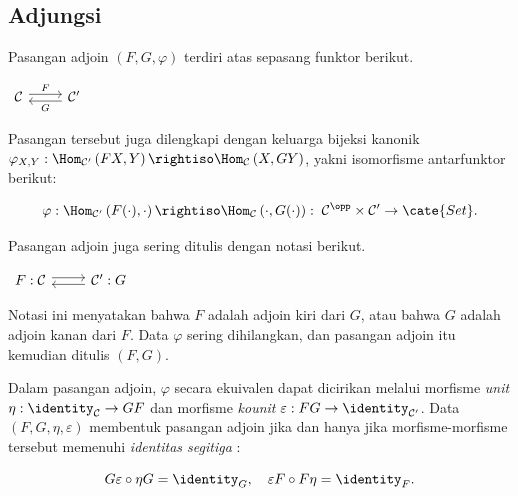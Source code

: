\subsection*{Adjungsi}

Pasangan adjoin $(F, G, \varphi)$ terdiri atas sepasang funktor berikut.

$\begin{tikzcd}
	\mathcal{C} \arrow[shift left, r, "F"] & \mathcal{C}' \arrow[shift left, l, "G"]
\end{tikzcd}$

Pasangan tersebut juga dilengkapi dengan keluarga bijeksi kanonik
$\varphi_{X, Y}: \Hom_{\mathcal{C}'}\left(FX, Y \right) \rightiso
\Hom_{\mathcal{C}}\left(X, GY \right)$, yakni isomorfisme antarfunktor berikut:

\[ \varphi: \Hom_{\mathcal{C}'}\left(F(\cdot), \cdot \right) \rightiso
\Hom_{\mathcal{C}}\left(\cdot, G(\cdot) \right): \;
\mathcal{C}^{\opp} \times \mathcal{C}' \to \cate{Set}. \]

Pasangan adjoin juga sering ditulis dengan notasi berikut.

$\begin{tikzcd}
	F: \mathcal{C} \arrow[shift left, r] & \mathcal{C}' \arrow[l, shift left] : G
\end{tikzcd}$

Notasi ini menyatakan bahwa $F$ adalah adjoin kiri dari $G$, atau bahwa $G$ adalah
adjoin kanan dari $F$. Data $\varphi$ sering dihilangkan, dan pasangan adjoin
itu kemudian ditulis $(F, G)$.

Dalam pasangan adjoin, $\varphi$ secara ekuivalen dapat dicirikan melalui
morfisme \emph{unit} $\eta: \identity_{\mathcal{C}} \to GF$ dan morfisme
\emph{kounit} $\varepsilon: FG \to \identity_{\mathcal{C}'}$. Data
$(F, G, \eta, \varepsilon)$ membentuk pasangan adjoin jika dan hanya jika
morfisme-morfisme tersebut memenuhi
\emph{identitas segitiga}
:

\[ G\varepsilon \circ \eta G = \identity_G, \quad
\varepsilon F \circ F\eta = \identity_F. \]

